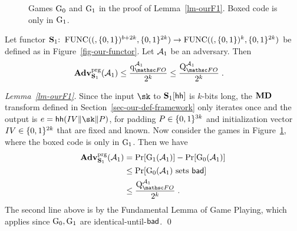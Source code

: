 \begin{figure}[t]
	\vspace{-5pt}
	\caption{Games $\textnormal{G}_0$ and $\textnormal{G}_1$ in the proof of Lemma~\ref{lm-ourF1}. Boxed code is only in $\textnormal{G}_1$.}
	\label{fig-lm2}
	\hrulefill
	\vspace{-10pt}
\end{figure}

\begin{lemma}\label{lm-ourF1} Let functor $\mathbf{S}_1{:\;\;} \mathrm{FUNC}((,\{0,1\})^{b+2k},\{0,1\}^{2k}) \to \mathrm{FUNC}((,\{0,1\})^k,\{0,1\}^{2k})$ be defined as in Figure~\ref{fig-our-functor}. Let $\mathcal{A}_1$ be an adversary. Then
\begin{align}
	\prgAdv{\ourF_1}{\advA_1} & \leq \frac{\QueriesD{\HASH}{\advA_1}}{2^k}  \leq \frac{\Queries{\HASH}{\advA_1}}{2^k} \;. \label{eq-lm-ourF1}
\end{align}
\end{lemma}

\begin{proof}[Lemma~\ref{lm-ourF1}] Since the input $\sk$ to $\mathbf{S}_1[\mathsf{hh}]$ is $k$-bits long, the $\mathbf{MD}$ transform defined in Section~\ref{sec-our-def-framework} only iterates once and the output is $e = \hh(\IV\|\sk\|P)$, for padding $P \in \{0,1\}^{3k}$ and initialization vector $IV \in \{0,1\}^{2k}$ that are fixed and known. Now consider the games in Figure~\ref{fig-lm2}, where the boxed code is only in $\textnormal{G}_1$. Then we have
\begin{align*}
	\prgAdv{\ourF_1}{\advA_1} &= \Pr[\Gm_1(\advA_1)] - \Pr[\Gm_0(\advA_1)] \\
	&\leq \Pr[\Gm_0(\advA_1)\mbox{ sets }\bad] \\
    &\leq 	\frac{\Queries{\HASH}{\advA_1}}{2^k} \;.
\end{align*}
The second line above is by the Fundamental Lemma of Game Playing, which applies since $\textnormal{G}_0,\textnormal{G}_1$ are identical-until-$\mathsf{bad}$. \qed
\end{proof}

